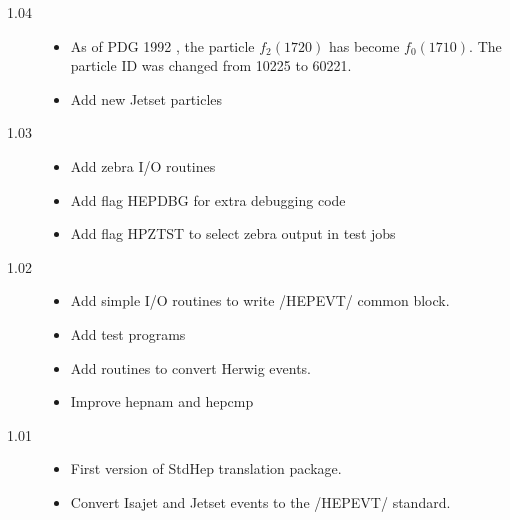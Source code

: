 \begin{description}
\item[1.04]

\begin{itemize}
\item As of PDG 1992 \cite{pdg92}, the particle $f_2(1720)$
has become $f_0(1710)$.  The particle ID was changed from 10225 to 60221.
\item Add new Jetset particles
\end{itemize}

\item[1.03]

\begin{itemize}
\item Add zebra I/O routines
\item Add flag HEPDBG for extra debugging code
\item Add flag HPZTST to select zebra output in test jobs
\end{itemize}

\item[1.02]

\begin{itemize}
\item Add simple I/O routines to write /HEPEVT/ common block.
\item Add test programs
\item Add routines to convert Herwig events.
\item Improve hepnam and hepcmp
\end{itemize}

\item[1.01]

\begin{itemize}
\item First version of StdHep translation package.
\item Convert Isajet and Jetset events to the /HEPEVT/ standard.
\end{itemize}

\end{description}
